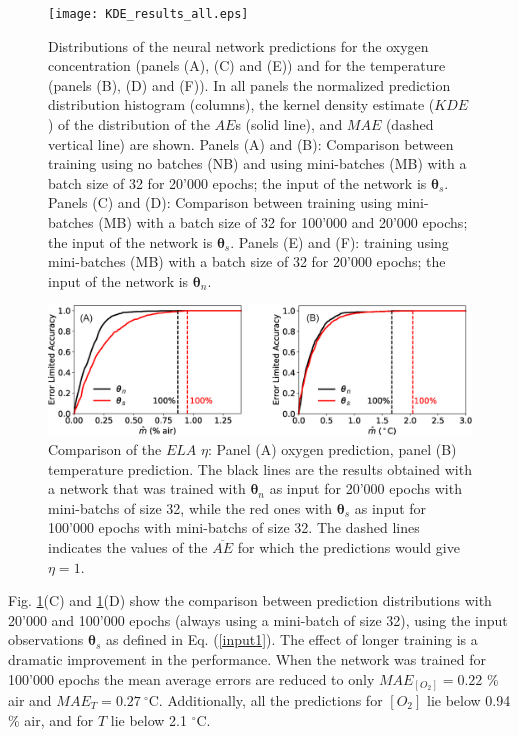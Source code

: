 \documentclass[final,5p,times,twocolumn]{elsarticle}
\begin{document}
\begin{figure}[htbp]
\centering
\texttt{[image: KDE\_results\_all.eps]}
\caption{Distributions of the neural network predictions for the oxygen concentration (panels (A), (C) and (E)) and for the temperature (panels (B), (D) and (F)). In all panels the normalized prediction distribution histogram (columns), the kernel density estimate ($KDE$) of the distribution of the $AE$s (solid line), and $MAE$ (dashed vertical line) are shown. Panels (A) and (B): Comparison between training using no batches (NB) and using mini-batches (MB) with a batch size of 32 for 20'000 epochs; the input of the network is ${\pmb \theta}_s$. Panels (C) and (D): Comparison between training using mini-batches (MB) with a batch size of 32 for 100'000 and 20'000 epochs; the input of the network is ${\pmb \theta}_s$. Panels (E) and (F): 
training using mini-batches (MB) with a batch size of 32 for 20'000 epochs; the input of the network is ${\pmb \theta}_n$.}
\label{fig:KDE_results_all}
\end{figure}

\begin{figure}[t!]
\centering
\includegraphics[width=14 cm]{ELA_comparison_O2_T.eps}
\caption{Comparison of the $ELA$ $\eta$: Panel (A) oxygen prediction, panel (B) temperature prediction. The black lines are the results obtained with a network that was trained with ${\pmb \theta}_n$ as input for 20'000 epochs with mini-batchs of size 32, while the red ones with ${\pmb \theta}_s$ as input for 100'000 epochs with mini-batchs of size 32. The dashed lines indicates the values of the $\overline{AE}$ for which the predictions would give $\eta=1$.}
\label{fig:ELA_result_comparison}
\end{figure}

Fig. \ref{fig:KDE_results_all}(C) and \ref{fig:KDE_results_all}(D) show the comparison between prediction distributions with 20'000 and 100'000 epochs (always using a mini-batch of size 32), using the input observations ${\pmb \theta}_s$ as defined in Eq. (\ref{input1}). The effect of longer training is a dramatic improvement in the performance. When the network was trained for 100'000 epochs the mean average errors are reduced to only $MAE_{[O_2]}=0.22$ \% air and $MAE_{T}=0.27  \ ^\circ$C. Additionally, all the predictions for $[O_2]$ lie below 0.94 \% air, and for $T$ lie below 2.1 $^\circ$C.
\end{document}
